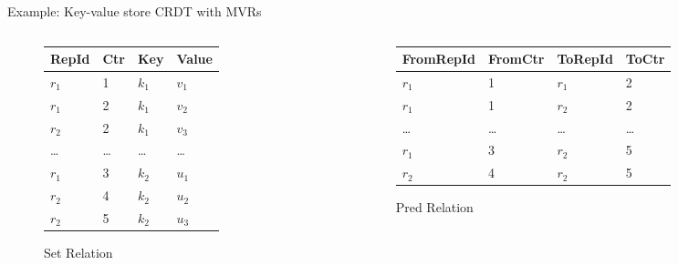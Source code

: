 \documentclass[USenglish,aspectratio=169]{beamer} %
\begin{document}
\begin{frame}{Example: Key-value store \acs{CRDT} with \aclp{MVR}}
    \begin{columns}
        \begin{column}{0.4\textwidth}
            \begin{figure}
                \centering
                \begin{tabular}{@{}llll@{}}
                    \toprule
                    RepId   & Ctr    & Key     & Value   \\
                    \midrule
                    \(r_1\) & 1      & \(k_1\) & \(v_1\) \\
                    \(r_1\) & 2      & \(k_1\) & \(v_2\) \\
                    \(r_2\) & 2      & \(k_1\) & \(v_3\) \\
                    \midrule
                    \ldots  & \ldots & \ldots  & \ldots  \\
                    \midrule
                    \(r_1\) & 3      & \(k_2\) & \(u_1\) \\
                    \(r_2\) & 4      & \(k_2\) & \(u_2\) \\
                    \(r_2\) & 5      & \(k_2\) & \(u_3\) \\
                    \bottomrule
                \end{tabular}
                \caption{Set Relation}
            \end{figure}
        \end{column}
        \begin{column}{0.6\textwidth}
            \begin{figure}
                \centering
                \begin{tabular}{@{}llll@{}}
                    \toprule
                    FromRepId & FromCtr & ToRepId & ToCtr  \\
                    \midrule
                    \(r_1\)   & 1       & \(r_1\) & 2      \\
                    \(r_1\)   & 1       & \(r_2\) & 2      \\
                    \midrule
                    \ldots    & \ldots  & \ldots  & \ldots \\
                    \midrule
                    \(r_1\)   & 3       & \(r_2\) & 5      \\
                    \(r_2\)   & 4       & \(r_2\) & 5      \\
                    \bottomrule
                \end{tabular}
                \caption{Pred Relation}
            \end{figure}
        \end{column}
    \end{columns}
\end{frame}
\end{document}
